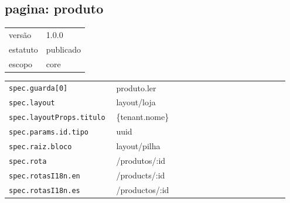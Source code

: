\subsection*{pagina: produto}
\begin{tabular}{@{}ll@{}}
versão & 1.0.0 \\
estatuto & publicado \\
escopo & core \\
\end{tabular}

\begin{tabular}{@{}p{0.35\linewidth}p{0.6\linewidth}@{}}
\texttt{spec.guarda[0]} & produto.ler \\
\texttt{spec.layout} & layout/loja \\
\texttt{spec.layoutProps.titulo} & \{tenant.nome\} \\
\texttt{spec.params.id.tipo} & uuid \\
\texttt{spec.raiz.bloco} & layout/pilha \\
\texttt{spec.rota} & /produtos/:id \\
\texttt{spec.rotasI18n.en} & /products/:id \\
\texttt{spec.rotasI18n.es} & /productos/:id \\
\end{tabular}
